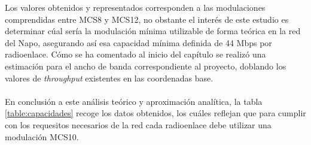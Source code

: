	Los valores obtenidos y representados corresponden a las modulaciones comprendidas entre MCS8 y MCS12, no obstante el interés de este estudio es determinar cúal sería la modulación mínima utilizable de forma teórica en la red del Napo, asegurando así esa capacidad mínima definida de 44 Mbps por radioenlace. Cómo se ha comentado al inicio del capítulo se realizó una estimación para el ancho de banda correspondiente al proyecto, doblando los valores de \textit{throughput} existentes en las coordenadas base.\\\\
	
	En conclusión a este análisis teórico y aproximación analítica, la tabla \ref{table:capacidades} recoge los datos obtenidos, los cuáles reflejan que para cumplir con los requesitos necesarios de la red cada radioenlace debe utilizar una modulación MCS10.   
	
